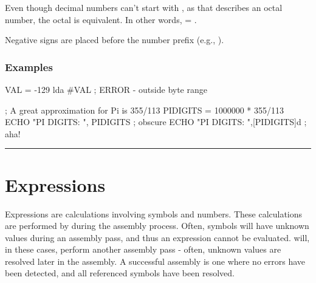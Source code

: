 Even though decimal numbers can't start with , as that describes an octal number, the octal  is equivalent. In other words,  = .

Negative signs are placed before the number prefix (e.g., ).

\subsubsection{Examples}


\begin{code}
VAL = -129
 lda #VAL           ; ERROR - outside byte range
\end{code}



\begin{code}
; A great approximation for Pi is 355/113
PIDIGITS = 1000000 * 355/113
  ECHO "PI DIGITS: ", PIDIGITS    ; obscure
  ECHO "PI DIGITS: ",[PIDIGITS]d  ; aha!
\end{code}





\hrule
{}


\section{Expressions}

Expressions are calculations involving symbols and numbers. These calculations are performed by \dasm during the assembly process. Often, symbols will have unknown values during an assembly pass, and thus an expression cannot be evaluated. \dasm will, in these cases, perform another assembly pass - often, unknown values are resolved later in the assembly. A successful assembly is one where no errors have been detected, and all referenced symbols have been resolved.

